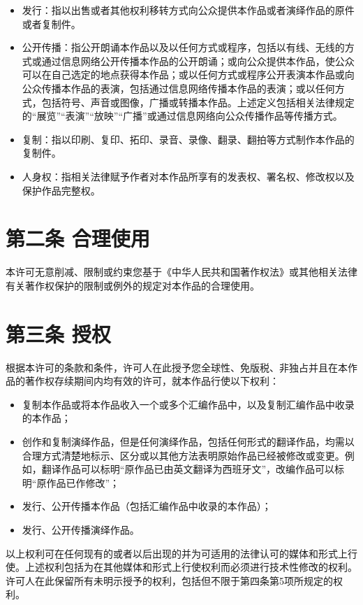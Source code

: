 \documentclass{book}
\begin{document}
\begin{itemize}
	\item 发行：指以出售或者其他权利移转方式向公众提供本作品或者演绎作品的原件或者复制件。
	\item 公开传播：指公开朗诵本作品以及以任何方式或程序，包括以有线、无线的方式或通过信息网络公开传播本作品的公开朗诵；或向公众提供本作品，使公众可以在自己选定的地点获得本作品；或以任何方式或程序公开表演本作品或向公众传播本作品的表演，包括通过信息网络传播本作品的表演；或以任何方式，包括符号、声音或图像，广播或转播本作品。上述定义包括相关法律规定的“展览”“表演”“放映”“广播”或通过信息网络向公众传播作品等传播方式。
	\item 复制：指以印刷、复印、拓印、录音、录像、翻录、翻拍等方式制作本作品的复制件。
	\item 人身权：指相关法律赋予作者对本作品所享有的发表权、署名权、修改权以及保护作品完整权。
\end{itemize}
\section{第二条 合理使用}
本许可无意削减、限制或约束您基于《中华人民共和国著作权法》或其他相关法律有关著作权保护的限制或例外的规定对本作品的合理使用。
\section{第三条 授权}
根据本许可的条款和条件，许可人在此授予您全球性、免版税、非独占并且在本作品的著作权存续期间内均有效的许可，就本作品行使以下权利：
\begin{itemize}
	\item 复制本作品或将本作品收入一个或多个汇编作品中，以及复制汇编作品中收录的本作品；
	\item 创作和复制演绎作品，但是任何演绎作品，包括任何形式的翻译作品，均需以合理方式清楚地标示、区分或以其他方法表明原始作品已经被修改或变更。例如，翻译作品可以标明“原作品已由英文翻译为西班牙文”，改编作品可以标明“原作品已作修改”；
	\item 发行、公开传播本作品（包括汇编作品中收录的本作品）； 
	\item 发行、公开传播演绎作品。
\end{itemize}
以上权利可在任何现有的或者以后出现的并为可适用的法律认可的媒体和形式上行使。上述权利包括为在其他媒体和形式上行使权利而必须进行技术性修改的权利。许可人在此保留所有未明示授予的权利，包括但不限于第四条第5项所规定的权利。
\end{document}
